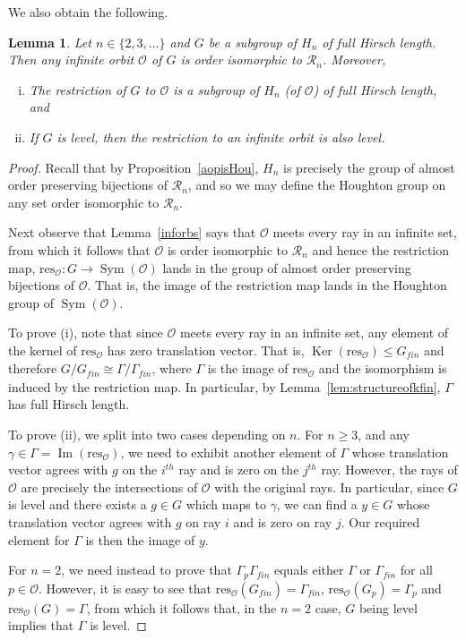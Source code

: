 \documentclass[11pt,a4paper]{amsart}
\newtheorem{lemma}[theorem]{Lemma}
\theoremstyle{definition}
\theoremstyle{remark}
\newcommand{\Sym}{\operatorname{Sym}}
\newcommand{\Ra}{\mathcal{R}}
\renewcommand{\ker}{\operatorname{Ker}}
\newcommand{\im}{\operatorname{Im}}
\newcommand{\gfin}{G_{\textit{fin}}}
\newcommand{\gamfin}{\Gamma_{\textit{fin}}}
\begin{document}
We also obtain the following.
\begin{lemma}
	\label{restricting}
	Let $n\in \{2, 3, \ldots\}$ and $G$ be a subgroup of $H_n$ of full Hirsch length. Then any infinite orbit $\mathcal{O}$ of $G$ is order isomorphic to $\Ra_n$. Moreover, 
	\begin{enumerate}[(i)]
		\item The restriction of $G$ to $\mathcal{O}$ is a subgroup of $H_n$ (of $\mathcal{O}$) of full Hirsch length, and
		\item If $G$ is level, then the restriction to an infinite orbit is also level. 
	\end{enumerate}
\end{lemma}
\begin{proof}
	Recall that by Proposition~\ref{aopisHou}, $H_n$ is precisely the group of almost order preserving bijections of $\Ra_n$, and so we may define the Houghton group on any set order isomorphic to $\Ra_n$. 
	
	
	Next observe that Lemma~\ref{inforbs} says that $\mathcal{O}$ meets every ray in an infinite set, from which it follows that $\mathcal{O}$ is order isomorphic to $\Ra_n$ and hence the restriction map, $\textrm{res}_{\mathcal{O}}: G \to \Sym(\mathcal{O})$ lands in the group of almost order preserving bijections of $\mathcal{O}$. That is, the image of the restriction map lands in the Houghton group of $\Sym(\mathcal{O})$. 
	
	To prove (i), note that since $\mathcal{O}$ meets every ray in an infinite set, any element of the kernel of  $\textrm{res}_{\mathcal{O}}$ has zero translation vector. That is, $\ker(\textrm{res}_{\mathcal{O}}) \leq \gfin $ and therefore $G/\gfin \cong \Gamma/\gamfin$, where $\Gamma$ is the image of $\textrm{res}_{\mathcal{O}}$ and the isomorphism is induced by the restriction map. In particular, by Lemma~\ref{lem:structureofkfin}, $\Gamma$ has full Hirsch length. 
	
	To prove (ii), we split into two cases depending on $n$. For $n \geq 3$, and any $\gamma \in \Gamma = \im(\textrm{res}_{\mathcal{O}})$, we need to exhibit another element of $\Gamma$ whose translation vector agrees with $g$ on the $i^{th}$ ray and is zero on the $j^{th}$ ray. However, the rays of $\mathcal{O}$ are precisely the intersections of $\mathcal{O}$ with the original rays. In particular, since $G$ is level and there exists a $g \in G $ which maps to $\gamma$, we can find a $y \in G$ whose translation vector agrees with $g$ on ray $i$ and is zero on ray $j$. Our required element for $\Gamma$ is then the image of $y$. 
	
	For $n=2$, we need instead to prove that $\Gamma_p \gamfin$ equals either $\Gamma$ or $\gamfin$ for all $p \in \mathcal{O}$. However, it is easy to see that 
	$\textrm{res}_{\mathcal{O}}(\gfin) = \gamfin$, $\textrm{res}_{\mathcal{O}}(G_p) = \Gamma_p$ and $\textrm{res}_{\mathcal{O}}(G) = \Gamma$, from which it follows that, in the $n=2$ case, $G$ being level implies that $\Gamma$ is level. 
\end{proof}
\end{document}
